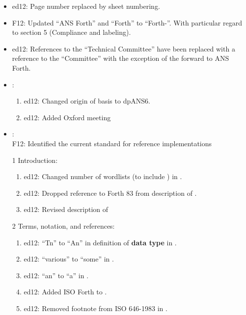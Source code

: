 	\begin{itemize}
	\item \textsf{ed12}: Page number replaced by sheet numbering.

	\item \textsf{F12}: Updated ``ANS Forth'' and ``Forth'' to ``Forth-\snapshot''.
		With particular regard to section 5 (Compliance and labeling).

	\item \textsf{ed12}: References to the ``Technical Committee'' have been
		replaced with a reference to the ``Committee'' with the exception of
		the forward to ANS Forth.

	\item {}: 							%
		\begin{enumerate}
		\item \textsf{ed12}: Changed origin of basis to dpANS6.
		\item \textsf{ed12}: Added Oxford meeting
		\end{enumerate}

	\item {}:							%
		\\ \textsf{F12}: Identified the current standard for reference implementations


	\item[1] Introduction:							%
		\begin{enumerate}
		\item \textsf{ed12}: Changed number of wordlists (to include ) in .
		\item \textsf{ed12}: Dropped reference to Forth 83 from description of .
		\item \textsf{ed12}: Revised description of 
		\end{enumerate}

	\item[2] Terms, notation, and references:	%
		\begin{enumerate}
		\item \textsf{ed12}: ``Tn'' to ``An'' in definition of \textbf{data type} in .
		\item \textsf{ed12}: ``various'' to ``some'' in .
		\item \textsf{ed12}: ``an'' to ``a'' in .
		\item \textsf{ed12}: Added ISO Forth to .
		\item \textsf{ed12}: Removed footnote from ISO 646-1983 in .
		\end{enumerate}


\end{itemize}
